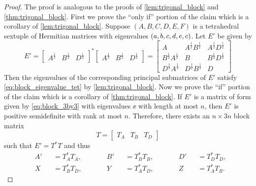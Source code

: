 \documentclass[notitlepage, 10pt]{article}
\begin{document}
\begin{proof}
    The proof is analogous to the proofs of \cref{lem:trigonal_block} and \cref{thm:trigonal_block}.
    First we prove the ``only if'' portion of the claim which is a corollary of \cref{lem:trigonal_block}.
    Suppose $(A,B,C,D,E,F)$ is a tetrahedral sextuple of Hermitian matrices with eigenvalues $(a,b,c,d,e,c)$.
    Let $E'$ be given by
    \begin{equation}
        E' =
        \begin{bmatrix}
            A^{\frac{1}{2}} & B^{\frac{1}{2}} & D^{\frac{1}{2}}
        \end{bmatrix}^{*}
        \begin{bmatrix}
            A^{\frac{1}{2}} & B^{\frac{1}{2}} & D^{\frac{1}{2}}
        \end{bmatrix}
        =
        \begin{bmatrix}
            A & A^{\frac{1}{2}}B^{\frac{1}{2}} & A^{\frac{1}{2}}D^{\frac{1}{2}} \\
            B^{\frac{1}{2}}A^{\frac{1}{2}} & B & B^{\frac{1}{2}}D^{\frac{1}{2}} \\
            D^{\frac{1}{2}}A^{\frac{1}{2}} & D^{\frac{1}{2}}B^{\frac{1}{2}} & D
        \end{bmatrix}
    \end{equation}
    Then the eigenvalues of the corresponding principal submatrices of $E'$ satisfy \cref{eq:block_eigenvalue_tet} by \cref{lem:trigonal_block}.
    Now we prove the ``if'' portion of the claim which is a corollary of \cref{thm:trigonal_block}.
    If $E'$ is a matrix of form given by \cref{eq:block_3by3} with eigenvalues $\ee$ with length at most $n$, then $E'$ is positive semidefinite with rank at most $n$.
    Therefore, there exists an $n\times 3n$ block matrix
    \begin{equation}
        T = \begin{bmatrix} T_{A} & T_{B} & T_{D} \end{bmatrix} 
    \end{equation}
    such that $E' = T^{*}T$ and thus
    \begin{equation}
        \begin{alignedat}{6}
            &A' &&= T_{A}^{*}T_{A}, \qquad
            &&B' &&= T_{B}^{*}T_{B}, \qquad
            &&D' &&= T_{D}^{*}T_{D}, \\
            &X &&= T_{B}^{*}T_{D}, \qquad
            &&Y &&= T_{A}^{*}T_{D}, \qquad
            &&Z &&= T_{A}^{*}T_{B}.
        \end{alignedat}

\end{equation}
\end{proof}
\end{document}
